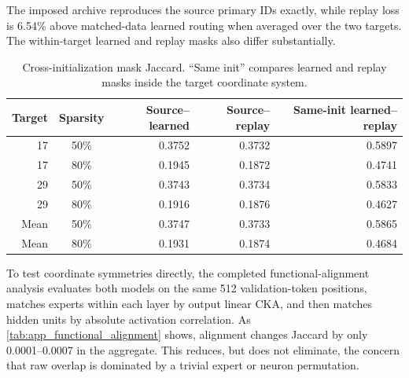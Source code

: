 \documentclass{article}
\begin{document}
\begin{table}[t]
\centering
\scriptsize
\caption{Cross-initialization replay performance and primary-route fidelity.
The source seed is 7; the two target rows are not a three-seed aggregate.}
\label{tab:app_cross_init_performance}
\end{table}

The imposed archive reproduces the source primary IDs exactly, while replay
loss is 6.54\% above matched-data learned routing when averaged over the two
targets. The within-target learned and replay masks also differ substantially.

\begin{table}[t]
\centering
\scriptsize
\caption{Cross-initialization mask Jaccard. ``Same init'' compares learned and
replay masks inside the target coordinate system.}
\label{tab:app_cross_init_masks}
\begin{tabular}{@{}rcrrr@{}}
\toprule
Target & Sparsity & Source--learned & Source--replay & Same-init learned--replay \\
\midrule
17 & 50\% & 0.3752 & 0.3732 & 0.5897 \\
17 & 80\% & 0.1945 & 0.1872 & 0.4741 \\
29 & 50\% & 0.3743 & 0.3734 & 0.5833 \\
29 & 80\% & 0.1916 & 0.1876 & 0.4627 \\
\midrule
Mean & 50\% & 0.3747 & 0.3733 & 0.5865 \\
Mean & 80\% & 0.1931 & 0.1874 & 0.4684 \\
\bottomrule
\end{tabular}
\end{table}

To test coordinate symmetries directly, the completed functional-alignment
analysis evaluates both models on the same 512 validation-token positions,
matches experts within each layer by output linear CKA, and then matches hidden
units by absolute activation correlation. As
\cref{tab:app_functional_alignment} shows,
alignment changes Jaccard by only 0.0001--0.0007 in the aggregate. This reduces,
but does not eliminate, the concern that raw overlap is dominated by a trivial
expert or neuron permutation.
\end{document}
